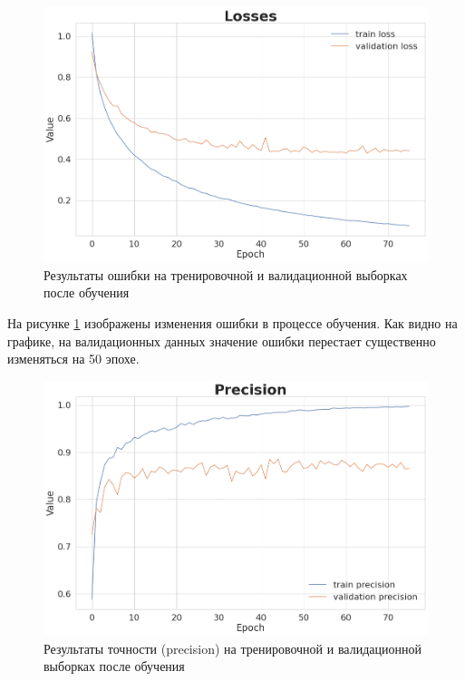 \documentclass[12pt, letterpaper]{article}
\begin{document}
    \begin{figure}[H]
        \centering
        \includegraphics[width=1\linewidth]{losses.png}
        \caption{Результаты ошибки на тренировочной и валидационной выборках после обучения}
        \label{fig:losses}
    \end{figure}
     
     На рисунке \ref{fig:losses} изображены изменения ошибки в процессе обучения. Как видно на графике, на валидационных данных значение ошибки перестает существенно изменяться на 50 эпохе.
    
    \begin{figure}[H]
        \centering
        \includegraphics[width=1\linewidth]{precision.png}
        \caption{Результаты точности (precision) на тренировочной и валидационной выборках после обучения}
        \label{fig:precision}
    \end{figure}
    
\end{document}
